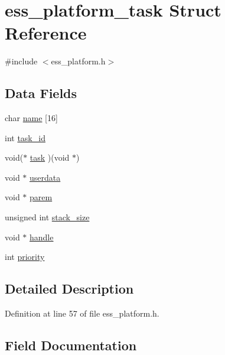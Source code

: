 \hypertarget{structess__platform__task}{}\section{ess\+\_\+platform\+\_\+task Struct Reference}
\label{structess__platform__task}


{\ttfamily \#include $<$ess\+\_\+platform.\+h$>$}

\subsection*{Data Fields}
\begin{DoxyCompactItemize}
\item 
char \hyperlink{structess__platform__task_acd328517a6cf718155c2e6e22b671ca9}{name} \mbox{[}16\mbox{]}
\item 
int \hyperlink{structess__platform__task_a24913131dc491a81c23f2b8246d85e3b}{task\+\_\+id}
\item 
void($\ast$ \hyperlink{structess__platform__task_aa81ff559f3f806e99d99a2b54d932c58}{task} )(void $\ast$)
\item 
void $\ast$ \hyperlink{structess__platform__task_afd0ffb02780e738d4c0a10ab833b7834}{userdata}
\item 
void $\ast$ \hyperlink{structess__platform__task_adb63250f3f4a729239fc7335f8773cf2}{parem}
\item 
unsigned int \hyperlink{structess__platform__task_adde5266300e9cdd7ca1134daba9adf24}{stack\+\_\+size}
\item 
void $\ast$ \hyperlink{structess__platform__task_a81011b79683fab64ce3aff71114f8fdd}{handle}
\item 
int \hyperlink{structess__platform__task_acec9ce2df15222151ad66fcb1d74eb9f}{priority}
\end{DoxyCompactItemize}


\subsection{Detailed Description}


Definition at line 57 of file ess\+\_\+platform.\+h.



\subsection{Field Documentation}
\mbox{\label{structess__platform__task_a81011b79683fab64ce3aff71114f8fdd}} 
